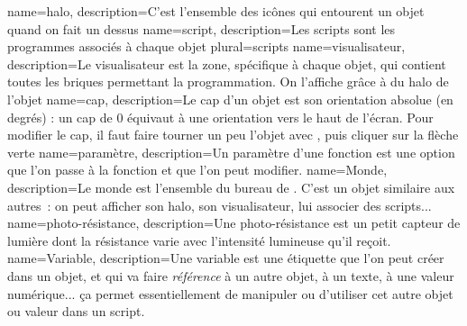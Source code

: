 

		{name={halo}, 
		description={C'est l'ensemble des icônes qui entourent un objet quand on fait un \rc dessus}}
		{name={script}, 
		description={Les scripts sont les programmes associés à chaque objet}
		plural={scripts}}
		{name={visualisateur}, 
		description={Le visualisateur est la zone, spécifique à chaque objet, qui contient toutes les briques permettant la programmation. On l'affiche grâce à  du halo de l'objet}}
		{name={cap}, 
		description={Le cap d'un objet est son orientation absolue (en degrés) : un cap de 0 équivaut à une orientation vers le haut de l'écran. Pour modifier le cap, il faut faire tourner un peu l'objet avec , puis cliquer sur la flèche verte }}
		{name={paramètre}, 
		description={Un paramètre d'une fonction est une option que l'on passe à la fonction et que l'on peut modifier.}}
		{name={Monde}, 
		description={Le  monde  est l'ensemble du bureau de \appName. C'est un objet similaire aux autres~: on peut afficher son halo, son visualisateur, lui associer des scripts...}}
		{name={photo-résistance}, 
		description={Une photo-résistance est un petit capteur de lumière dont la résistance varie avec l'intensité lumineuse qu'il reçoit.}}
		{name={Variable}, 
		description={Une variable est une étiquette que l'on peut créer dans un objet, et qui va faire \textit{référence} à un autre objet, à un texte, à une valeur numérique... ça permet essentiellement de manipuler ou d'utiliser cet autre objet ou valeur dans un script.}}
